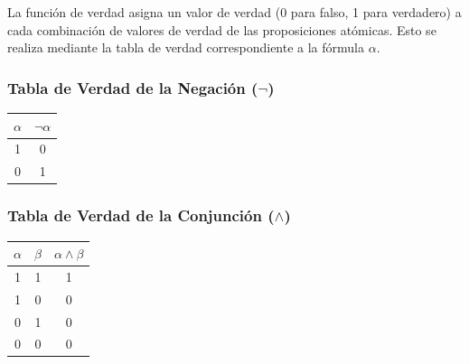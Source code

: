 \bigskip

La función de verdad asigna un valor de verdad (0 para falso, 1 para verdadero) a cada combinación de valores de verdad de las proposiciones atómicas. Esto se realiza mediante la tabla de verdad correspondiente a la fórmula $\alpha$.








\subsubsection{Tabla de Verdad de la Negación ($\neg$)}

\begin{center}
    \begin{tabular}{|c||c|}
        \hline
        $\alpha$ & $\neg \alpha$ \\
        \hline
        1 & 0 \\
        \hline
        0 & 1 \\
        \hline
    \end{tabular}
\end{center}


\subsubsection{Tabla de Verdad de la Conjunción ($\land$)}

\begin{center}
    \begin{tabular}{|c|c||c|}
        \hline
        $\alpha$ & $\beta$ & $\alpha \land \beta$ \\
        \hline
        1 & 1 & 1 \\
        \hline
        1 & 0 & 0 \\
        \hline
        0 & 1 & 0 \\
        \hline
        0 & 0 & 0 \\
        \hline
    \end{tabular}
\end{center}

